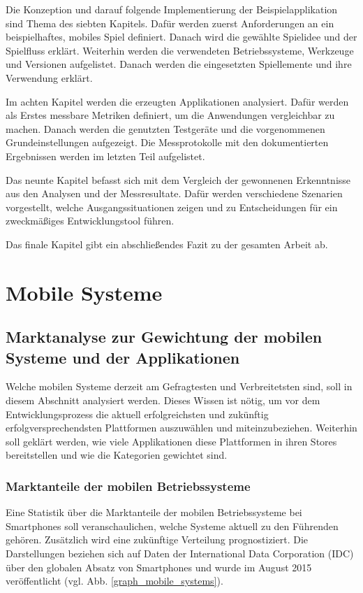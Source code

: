 \bigskip
Die Konzeption und darauf folgende Implementierung der Beispielapplikation sind Thema des siebten Kapitels. Dafür werden zuerst Anforderungen an ein beispielhaftes, mobiles Spiel definiert. Danach wird die gewählte Spielidee und der Spielfluss erklärt. Weiterhin werden die verwendeten Betriebssysteme, Werkzeuge und Versionen aufgelistet. Danach werden die eingesetzten Spiellemente und ihre Verwendung erklärt.

\bigskip
Im achten Kapitel werden die erzeugten Applikationen analysiert. Dafür werden als Erstes messbare Metriken definiert, um die Anwendungen vergleichbar zu machen. Danach werden die genutzten Testgeräte und die vorgenommenen Grundeinstellungen aufgezeigt. Die Messprotokolle mit den dokumentierten Ergebnissen werden im letzten Teil aufgelistet.

\bigskip
Das neunte Kapitel befasst sich mit dem Vergleich der gewonnenen Erkenntnisse aus den Analysen und der Messresultate. Dafür werden verschiedene Szenarien vorgestellt, welche Ausgangssituationen zeigen und zu Entscheidungen für ein zweckmäßiges Entwicklungstool führen.

\bigskip
Das finale Kapitel gibt ein abschließendes Fazit zu der gesamten Arbeit ab.

\chapter{Mobile Systeme}

\section{Marktanalyse zur Gewichtung der mobilen Systeme und der Applikationen}
Welche mobilen Systeme derzeit am Gefragtesten und Verbreitetsten sind, soll in diesem Abschnitt analysiert werden. Dieses Wissen ist nötig, um vor dem Entwicklungsprozess die aktuell erfolgreichsten und zukünftig erfolgversprechendsten Plattformen auszuwählen und miteinzubeziehen.
Weiterhin soll geklärt werden, wie viele Applikationen diese Plattformen in ihren Stores bereitstellen und wie die Kategorien gewichtet sind.

\subsection{Marktanteile der mobilen Betriebssysteme}
\label{subsec:Marktanteile_mobile_Systeme}
Eine Statistik über die Marktanteile der mobilen Betriebssysteme bei Smartphones soll veranschaulichen, welche Systeme aktuell zu den Führenden gehören. Zusätzlich wird eine zukünftige Verteilung prognostiziert. Die Darstellungen beziehen sich auf Daten der International Data Corporation (IDC) über den globalen Absatz von Smartphones und wurde im August 2015 veröffentlicht (vgl. Abb. \ref{graph_mobile_systems}). 

